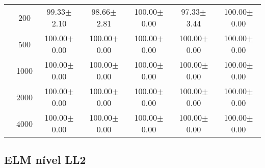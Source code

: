 \begin{table}[H]
\begin{tabular}{|c|c|c c c c c|}
\multicolumn{1}{|c|}{ \multirow{5}{*}{\rotatebox[origin=c]{90}{\textbf{Neurônios}}} }

& 200	&99.33$\pm$2.10		&98.66$\pm$2.81		&100.00$\pm$0.00	&97.33$\pm$3.44		& 100.00$\pm$0.00 \\\cline{2-7}

& 500	& 100.00$\pm$0.00	& 100.00$\pm$0.00	&100.00$\pm$0.00	 &100.00$\pm$0.00	&100.00$\pm$0.00 \\\cline{2-7}

& 1000	&100.00$\pm$0.00	&100.00$\pm$0.00	&100.00$\pm$0.00	&100.00$\pm$0.00	&100.00$\pm$0.00 \\\cline{2-7}

& 2000	&100.00$\pm$0.00	&100.00$\pm$0.00	&100.00$\pm$0.00	&100.00$\pm$0.00	&100.00$\pm$0.00 \\\cline{2-7}

& 4000	&100.00$\pm$0.00	&100.00$\pm$0.00	&100.00$\pm$0.00	&100.00$\pm$0.00	&100.00$\pm$0.00  \\\midrule

	\end{tabular}
\end{table}


\subsection{ELM nível LL2}

